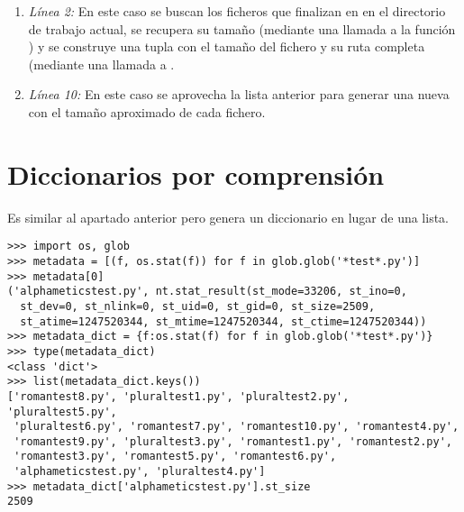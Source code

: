 \begin{enumerate}

\item \emph{Línea 2:} En este caso se buscan los ficheros que finalizan en  en el directorio de trabajo actual, se recupera su tamaño (mediante una llamada a la función ) y se construye una tupla con el tamaño del fichero y su ruta completa (mediante una llamada a .

\item \emph{Línea 10:} En este caso se aprovecha la lista anterior para generar una nueva con el tamaño aproximado de cada fichero.

\end{enumerate}
 
\section{Diccionarios por comprensión}

Es similar al apartado anterior pero genera un diccionario en lugar de una lista.

\noindent\begin{minipage}{\textwidth}
\begin{lstlisting}[mathescape=True]
>>> import os, glob
>>> metadata = [(f, os.stat(f)) for f in glob.glob('*test*.py')]
>>> metadata[0]
('alphameticstest.py', nt.stat_result(st_mode=33206, st_ino=0,
  st_dev=0, st_nlink=0, st_uid=0, st_gid=0, st_size=2509,
  st_atime=1247520344, st_mtime=1247520344, st_ctime=1247520344))
>>> metadata_dict = {f:os.stat(f) for f in glob.glob('*test*.py')}
>>> type(metadata_dict)
<class 'dict'>
>>> list(metadata_dict.keys())
['romantest8.py', 'pluraltest1.py', 'pluraltest2.py', 'pluraltest5.py',
 'pluraltest6.py', 'romantest7.py', 'romantest10.py', 'romantest4.py',
 'romantest9.py', 'pluraltest3.py', 'romantest1.py', 'romantest2.py',
 'romantest3.py', 'romantest5.py', 'romantest6.py',
 'alphameticstest.py', 'pluraltest4.py']
>>> metadata_dict['alphameticstest.py'].st_size
2509
\end{lstlisting}
\end{minipage}

